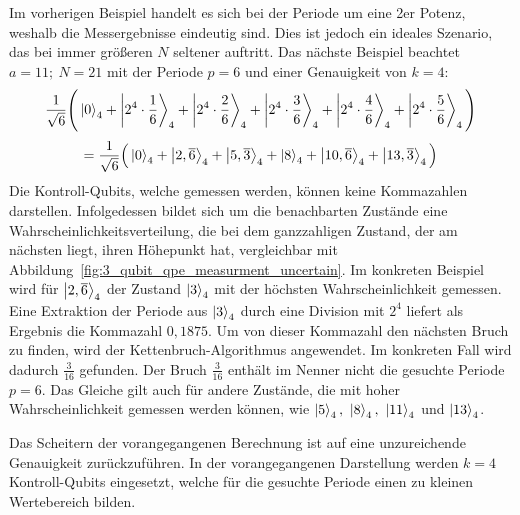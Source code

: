 Im vorherigen Beispiel handelt es sich bei der Periode um eine 2er Potenz, 
weshalb die Messergebnisse eindeutig sind.
Dies ist jedoch ein ideales Szenario, 
das bei immer größeren \(N\) seltener auftritt. 
Das nächste Beispiel beachtet \(a=11;~N=21\) mit der Periode \(p=6\) und einer Genauigkeit von \(k=4\):
\[\frac{1}{\sqrt{6}}
\Bigg(\ket{0}_4 +\ket{2^4 \cdot \frac{1}{6}}_4 + \ket{2^4 \cdot \frac{2}{6}}_4+
\ket{2^4 \cdot \frac{3}{6}}_4+\ket{2^4 \cdot \frac{4}{6}}_4 + \ket{2^4 \cdot \frac{5}{6}}_4
\Bigg) \]
\[= \frac{1}{\sqrt{6}}
\Big(\ket{0}_4 +\ket{2,\overline{6}}_4 + \ket{5,\overline{3}}_4+
\ket{8}_4+\ket{10,\overline{6}}_4 + \ket{13,\overline{3}}_4
\Big) \]
Die Kontroll-Qubits, welche gemessen werden, 
können keine Kommazahlen darstellen.
Infolgedessen bildet sich um die benachbarten Zustände eine Wahrscheinlichkeitsverteilung, 
die bei dem ganzzahligen Zustand, der am nächsten liegt, 
ihren Höhepunkt hat, vergleichbar mit Abbildung~\ref{fig:3_qubit_qpe_measurment_uncertain}.
Im konkreten Beispiel wird für \(\ket{2,\overline{6}}_4\) der Zustand \(\ket{3}_4\) 
mit der höchsten Wahrscheinlichkeit gemessen.
Eine Extraktion der Periode aus \(\ket{3}_4\) durch eine Division mit \(2^4\) liefert als Ergebnis die Kommazahl \(0,1875\).
Um von dieser Kommazahl den nächsten Bruch zu finden, wird der Kettenbruch-Algorithmus angewendet.
Im konkreten Fall wird dadurch \(\frac{3}{16}\) gefunden.
Der Bruch \(\frac{3}{16}\) enthält im Nenner nicht die gesuchte Periode \(p=6\). 
Das Gleiche gilt auch für andere Zustände, 
die mit hoher Wahrscheinlichkeit gemessen werden können, wie 
\(\ket{5}_4,~\ket{8}_4,~\ket{11}_4\) und \(\ket{13}_4\).

Das Scheitern der vorangegangenen Berechnung ist auf eine unzureichende Genauigkeit zurückzuführen. 
In der vorangegangenen Darstellung werden \(k=4\) Kontroll-Qubits eingesetzt, 
welche für die gesuchte Periode einen zu kleinen Wertebereich bilden.

